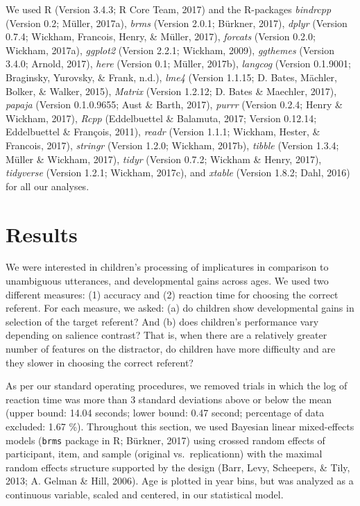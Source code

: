 \documentclass[mask,man]{apa6}
\theoremstyle{definition}
\theoremstyle{definition}
\theoremstyle{definition}
\theoremstyle{remark}
\begin{document}
We used R (Version 3.4.3; R Core Team, 2017) and the R-packages
\emph{bindrcpp} (Version 0.2; Müller, 2017a), \emph{brms} (Version
2.0.1; Bürkner, 2017), \emph{dplyr} (Version 0.7.4; Wickham, Francois,
Henry, \& Müller, 2017), \emph{forcats} (Version 0.2.0; Wickham, 2017a),
\emph{ggplot2} (Version 2.2.1; Wickham, 2009), \emph{ggthemes} (Version
3.4.0; Arnold, 2017), \emph{here} (Version 0.1; Müller, 2017b),
\emph{langcog} (Version 0.1.9001; Braginsky, Yurovsky, \& Frank, n.d.),
\emph{lme4} (Version 1.1.15; D. Bates, Mächler, Bolker, \& Walker,
2015), \emph{Matrix} (Version 1.2.12; D. Bates \& Maechler, 2017),
\emph{papaja} (Version 0.1.0.9655; Aust \& Barth, 2017), \emph{purrr}
(Version 0.2.4; Henry \& Wickham, 2017), \emph{Rcpp} (Eddelbuettel \&
Balamuta, 2017; Version 0.12.14; Eddelbuettel \& François, 2011),
\emph{readr} (Version 1.1.1; Wickham, Hester, \& Francois, 2017),
\emph{stringr} (Version 1.2.0; Wickham, 2017b), \emph{tibble} (Version
1.3.4; Müller \& Wickham, 2017), \emph{tidyr} (Version 0.7.2; Wickham \&
Henry, 2017), \emph{tidyverse} (Version 1.2.1; Wickham, 2017c), and
\emph{xtable} (Version 1.8.2; Dahl, 2016) for all our analyses.

\section{Results}\label{results}

We were interested in children's processing of implicatures in
comparison to unambiguous utterances, and developmental gains across
ages. We used two different measures: (1) accuracy and (2) reaction time
for choosing the correct referent. For each measure, we asked: (a) do
children show developmental gains in selection of the target referent?
And (b) does children's performance vary depending on salience contrast?
That is, when there are a relatively greater number of features on the
distractor, do children have more difficulty and are they slower in
choosing the correct referent?

As per our standard operating procedures, we removed trials in which the
log of reaction time was more than 3 standard deviations above or below
the mean (upper bound: 14.04 seconds; lower bound: 0.47 second;
percentage of data excluded: 1.67 \%). Throughout this section, we used
Bayesian linear mixed-effects models (\texttt{brms} package in R;
Bürkner, 2017) using crossed random effects of participant, item, and
sample (original vs.~replicationn) with the maximal random effects
structure supported by the design (Barr, Levy, Scheepers, \& Tily, 2013;
A. Gelman \& Hill, 2006). Age is plotted in year bins, but was analyzed
as a continuous variable, scaled and centered, in our statistical model.
\end{document}
